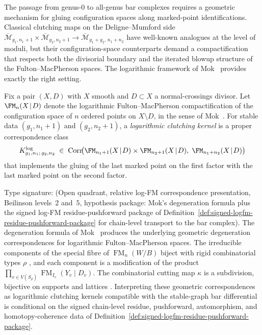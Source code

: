 The passage from genus-$0$ to all-genus bar complexes requires a
geometric mechanism for gluing configuration spaces along
marked-point identifications. Classical clutching maps on the
Deligne--Mumford side
$\overline{\mathcal{M}}_{g_1,n_1+1} \times
\overline{\mathcal{M}}_{g_2,n_2+1} \to
\overline{\mathcal{M}}_{g_1+g_2,\,n_1+n_2}$
have well-known analogues at the level of moduli, but their
configuration-space counterparts demand a compactification
that respects both the divisorial boundary and the iterated
blowup structure of the Fulton--MacPherson spaces.
The logarithmic framework of Mok~\cite{Mok25} provides exactly
the right setting.

\begin{definition}%
\label{def:log-clutching-kernel}
Fix a pair $(X,D)$ with $X$ smooth and $D \subset X$ a
normal-crossings divisor. Let $\FM_n(X \!\mid\! D)$ denote the
logarithmic Fulton--MacPherson compactification of the configuration
space of $n$ ordered points on $X \setminus D$, in the sense of
Mok~\cite{Mok25}. For stable data $(g_1,n_1+1)$ and $(g_2,n_2+1)$,
a \emph{logarithmic clutching kernel} is a proper correspondence class
\[
 K^{\mathrm{log}}_{g_1,n_1;\,g_2,n_2}
 \;\in\;
 \mathrm{Corr}\!\bigl(
 \FM_{n_1+1}(X \!\mid\! D) \times \FM_{n_2+1}(X \!\mid\! D),\;
 \FM_{n_1+n_2}(X \!\mid\! D)
 \bigr)
\]
that implements the gluing of the last marked point on the first
factor with the last marked point on the second factor.
\end{definition}

\begin{theorem}%
\label{thm:log-clutching-degeneration}%
Type signature: \textup{(}Open quadrant, relative log-FM
correspondence presentation, Beilinson levels~$2$ and~$5$,
hypothesis package: Mok's degeneration formula plus the signed
log-FM residue-pushforward package of
Definition~\ref{def:signed-logfm-residue-pushforward-package} for
chain-level transport to the bar complex\textup{)}.
The degeneration formula of Mok~\cite[Corollary~5.3.4]{Mok25}
produces the underlying geometric degeneration correspondences for
logarithmic Fulton--MacPherson spaces.
The irreducible components of the special fibre of\/
$\operatorname{FM}_n(W/B)$ biject with rigid combinatorial types
$\rho$ \cite[Definition~4.7.1]{Mok25}, and each component is a
modification of the product
$\prod_{v \in V(S_\rho)} \operatorname{FM}_{I_v}(Y_v \mathbin{|} D_v)$.
The combinatorial cutting map $\kappa$ is a subdivision, bijective
on supports and lattices \cite[Lemma~5.3.1]{Mok25}. Interpreting
these geometric correspondences as logarithmic clutching kernels
compatible with the stable-graph bar differential is conditional on
the signed chain-level residue, pushforward, automorphism, and
homotopy-coherence data of
Definition~\ref{def:signed-logfm-residue-pushforward-package}.
\end{theorem}

